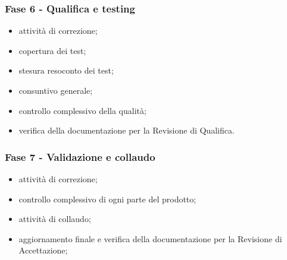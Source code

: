    \subsubsection{Fase 6 - Qualifica e testing}
        \begin{itemize}
            \item attività di correzione;
            \item copertura dei test;
            \item stesura resoconto dei test;
            \item consuntivo generale;
            \item controllo complessivo della qualità;
            \item verifica della documentazione per la Revisione di Qualifica.
        \end{itemize}

    \subsubsection{Fase 7 - Validazione e collaudo}
        \begin{itemize}
            \item attività di correzione;
            \item controllo complessivo di ogni parte del prodotto;
            \item attività di collaudo;
            \item aggiornamento finale e verifica della documentazione per la Revisione di Accettazione;
        \end{itemize}
